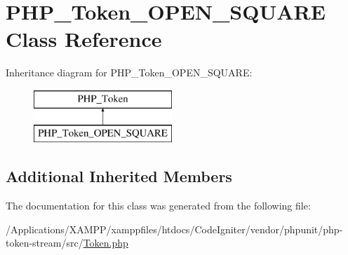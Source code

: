 \hypertarget{class_p_h_p___token___o_p_e_n___s_q_u_a_r_e}{}\section{P\+H\+P\+\_\+\+Token\+\_\+\+O\+P\+E\+N\+\_\+\+S\+Q\+U\+A\+RE Class Reference}
\label{class_p_h_p___token___o_p_e_n___s_q_u_a_r_e}
Inheritance diagram for P\+H\+P\+\_\+\+Token\+\_\+\+O\+P\+E\+N\+\_\+\+S\+Q\+U\+A\+RE\+:\begin{figure}[H]
\begin{center}
\leavevmode
\includegraphics[height=2.000000cm]{class_p_h_p___token___o_p_e_n___s_q_u_a_r_e}
\end{center}
\end{figure}
\subsection*{Additional Inherited Members}


The documentation for this class was generated from the following file\+:\begin{DoxyCompactItemize}
\item 
/\+Applications/\+X\+A\+M\+P\+P/xamppfiles/htdocs/\+Code\+Igniter/vendor/phpunit/php-\/token-\/stream/src/\mbox{\hyperlink{_token_8php}{Token.\+php}}\end{DoxyCompactItemize}
